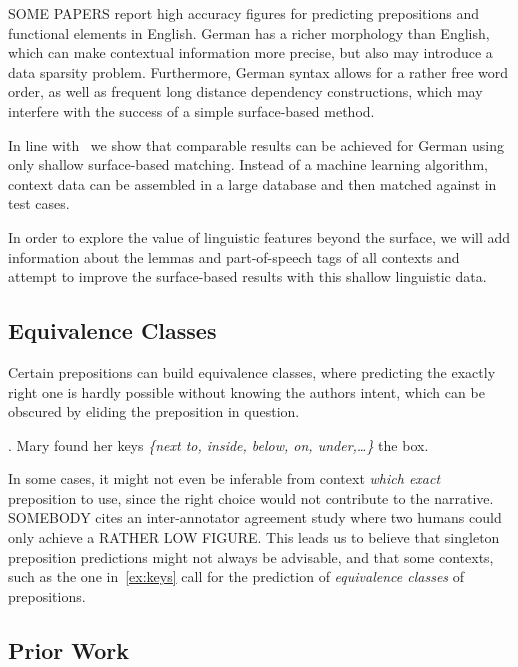 \documentclass[12pt]{article}
\begin{document}
SOME PAPERS %
report high accuracy figures for predicting prepositions and functional elements
in English. German has a richer morphology than English, which can make
contextual information more precise, but also may introduce a data sparsity
problem. Furthermore, German syntax allows for a rather free word order, as well
as frequent long distance dependency constructions, which may interfere with the
success of a simple surface-based method.

In line with~\citep{elghafariETAL2010} we show that comparable results can be
achieved for German using only shallow surface-based matching. Instead of a
machine learning algorithm, context data can be assembled in a large database
and then matched against in test cases.

In order to explore the value of linguistic features beyond the surface, we will
add information about the lemmas and part-of-speech tags of all contexts and
attempt to improve the surface-based results with this shallow linguistic data.

\subsection{Equivalence Classes} %
\label{sec:eqclass}              %
Certain prepositions can build equivalence classes, where
predicting the exactly right one is hardly possible without knowing the authors
intent, which can be obscured by eliding the preposition in question.

\ex. Mary found her keys \textit{\{next to, inside, below, on, under,\ldots{}\}} the box.
\label{ex:keys}

In some cases, it might not even be inferable from context \textit{which exact}
preposition to use, since the right choice would not contribute to the
narrative. SOMEBODY %
cites an inter-annotator agreement study where two humans could only achieve a
RATHER LOW FIGURE. %
This leads us to believe that singleton preposition predictions might not always
be advisable, and that some contexts, such as the one in~\ref{ex:keys} call for
the prediction of \textit{equivalence classes} of prepositions.

\subsection{Prior Work}
\end{document}
